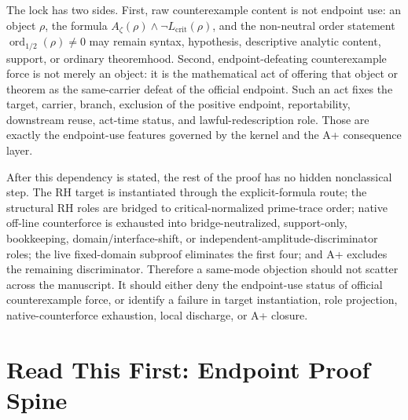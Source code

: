 \documentclass[11pt]{article}
\newcommand{\Az}{A_{\zeta}}
\newcommand{\Lcrit}{L_{\mathrm{crit}}}
\newcommand{\ordhalf}{\operatorname{ord}_{1/2}}
\begin{document}
The lock has two sides.  First, raw counterexample content is not endpoint use: an object \(\rho\), the formula \(\Az(\rho)\wedge\neg\Lcrit(\rho)\), and the non-neutral order statement \(\ordhalf(\rho)\ne0\) may remain syntax, hypothesis, descriptive analytic content, support, or ordinary theoremhood.  Second, endpoint-defeating counterexample force is not merely an object: it is the mathematical act of offering that object or theorem as the same-carrier defeat of the official endpoint.  Such an act fixes the target, carrier, branch, exclusion of the positive endpoint, reportability, downstream reuse, act-time status, and lawful-redescription role.  Those are exactly the endpoint-use features governed by the kernel and the A+ consequence layer.

After this dependency is stated, the rest of the proof has no hidden nonclassical step.  The RH target is instantiated through the explicit-formula route; the structural RH roles are bridged to critical-normalized prime-trace order; native off-line counterforce is exhausted into bridge-neutralized, support-only, bookkeeping, domain/interface-shift, or independent-amplitude-discriminator roles; the live fixed-domain subproof eliminates the first four; and A+ excludes the remaining discriminator.  Therefore a same-mode objection should not scatter across the manuscript.  It should either deny the endpoint-use status of official counterexample force, or identify a failure in target instantiation, role projection, native-counterforce exhaustion, local discharge, or A+ closure.

\tableofcontents
\newpage

\section*{Read This First: Endpoint Proof Spine}
\end{document}
